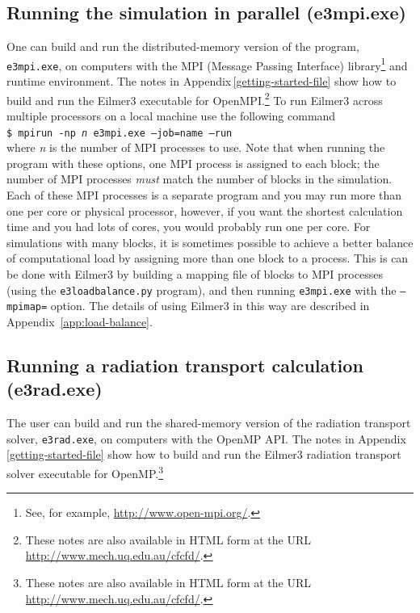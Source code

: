 \subsection{Running the simulation in parallel (e3mpi.exe)}
%
One can build and run the distributed-memory version of the program, 
\texttt{e3mpi.exe}, on computers with 
the MPI (Message Passing Interface) library\footnote{See, for example, \url{http://www.open-mpi.org/}.} 
and runtime environment.
The notes in Appendix\,\ref{getting-started-file} show how to build and run 
the Eilmer3 executable for OpenMPI.\footnote{These notes are also available in HTML form at the URL
\url{http://www.mech.uq.edu.au/cfcfd/}.}
To run Eilmer3 across multiple processors
on a local machine use the following command\\
\texttt{\$ mpirun -np \textit{n} e3mpi.exe --job=name --run}\\
where \textit{n} is the number of MPI processes to use.
Note that when running the program with these options,
one MPI process is assigned to each block; 
the number of MPI processes \emph{must} match the number of blocks in the simulation.
Each of these MPI processes is a separate program and you may run more than one per core 
or physical processor, however, if you want the shortest calculation time and you had lots of cores,
you would probably run one per core.
For simulations with many blocks, it is sometimes possible to achieve a better balance of
computational load by assigning more than one block to a process.
This is can be done with Eilmer3 by building a mapping file of blocks to MPI processes
(using the \texttt{e3loadbalance.py} program), and then running \texttt{e3mpi.exe} with
the \texttt{--mpimap=} option.
The details of using Eilmer3 in this way are described in Appendix~\ref{app:load-balance}. 

\subsection{Running a radiation transport calculation (e3rad.exe)}
% 
The user can build and run the shared-memory version of the radiation transport solver,
\texttt{e3rad.exe}, on computers with the OpenMP API.
The notes in Appendix\,\ref{getting-started-file} show how to build and run 
the Eilmer3 radiation transport solver executable for OpenMP.\footnote{These notes are
 also available in HTML form at the URL \url{http://www.mech.uq.edu.au/cfcfd/}.}


